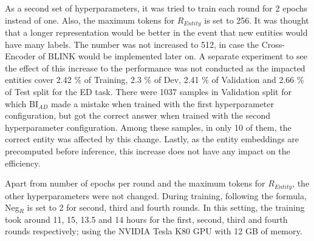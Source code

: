 \documentclass{report}
\theoremstyle{definition}
\theoremstyle{remark}
\begin{document}
As a second set of hyperparameters, it was tried to train each round for 2 epochs instead of one. Also, the maximum tokens for $R_{Entity}$ is set to 256. It was thought that a longer representation would be better in the event that new entities would have many labels. The number was not increased to 512, in case the Cross-Encoder of BLINK \cite{scalablezeroshot} would be implemented later on. A separate experiment to see the effect of this increase to the performance was not conducted as the impacted entities cover 2.42 \% of Training, 2.3 \% of Dev, 2.41 \% of Validation and 2.66 \% of Test split for the ED task. There were 1037 samples in Validation split for which BI$_{AD}$ made a mistake when trained with the first hyperparameter configuration, but got the correct answer when trained with the second hyperparameter configuration. Among these samples, in only 10 of them, the correct entity was affected by this change. Lastly, as the entity embeddings are precomputed before inference, this increase does not have any impact on the efficiency.

Apart from number of epochs per round and the maximum tokens for $R_{Entity}$, the other hyperparameters were not changed. During training, following the formula, Neg$_R$ is set to 2 for second, third and fourth rounds. In this setting, the training took around 11, 15, 13.5 and 14 hours for the first, second, third and fourth rounds respectively; using the NVIDIA Tesla K80 GPU with 12 GB of memory.
\end{document}
